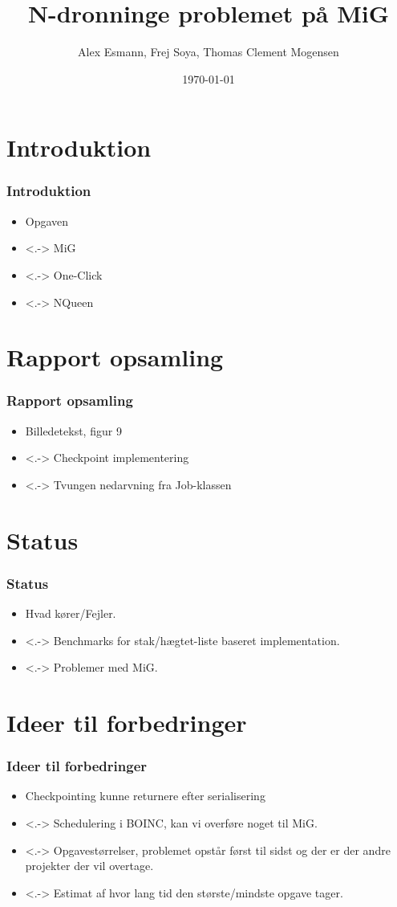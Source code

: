 \documentclass{beamer}
\title{N-dronninge problemet på MiG}
\author{Alex Esmann, Frej Soya, Thomas Clement Mogensen}
\date{\today}
\begin{document}
\frame{\titlepage}
\section{Introduktion}
\frame
{
	\frametitle{Introduktion}

	\begin{itemize}
	\item<1-> Opgaven
	\item<.-> MiG
	\item<.-> One-Click
	\item<.-> NQueen
	\end{itemize}
}


\section{Rapport opsamling}
\frame
{
  \frametitle{Rapport opsamling}

  \begin{itemize}
  \item<1-> Billedetekst, figur 9
  \item<.-> Checkpoint implementering
  \item<.-> Tvungen nedarvning fra Job-klassen
  \end{itemize}
}

\section{Status}
\frame
{
  \frametitle{Status}

  \begin{itemize}
  \item<1-> Hvad kører/Fejler.
  \item<.-> Benchmarks for stak/hægtet-liste baseret implementation.
  \item<.-> Problemer med MiG.      
  \end{itemize}
}

\section{Ideer til forbedringer}
\frame
{
  \frametitle{Ideer til forbedringer}

  \begin{itemize}
  \item<1-> Checkpointing kunne returnere efter serialisering
  \item<.-> Schedulering i BOINC, kan vi overføre noget til MiG.
  \item<.-> Opgavestørrelser, problemet opstår først til sidst og der er der andre projekter der vil overtage.      
	\item<.-> Estimat af hvor lang tid den største/mindste opgave tager. 
  \end{itemize}
}
\end{document}
